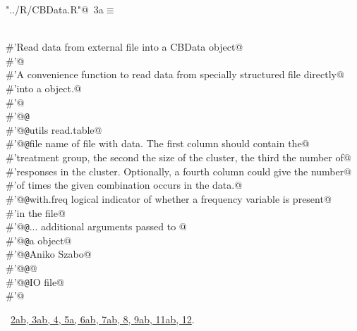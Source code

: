 \documentclass[reqno]{amsart}
\renewcommand{\NWtarget}[2]{\hypertarget{#1}{#2}}
\renewcommand{\NWlink}[2]{\hyperlink{#1}{#2}}
\begin{document}
\begin{flushleft} \small
\begin{minipage}{\linewidth}\label{scrap4}\raggedright\small
\NWtarget{nuweb3a}{} \verb@"../R/CBData.R"@\nobreak\ {\footnotesize {3a}}$\equiv$
\vspace{-1ex}
\begin{list}{}{} \item
\mbox{}\verb@@\\
\mbox{}\verb@#'Read data from external file into a CBData object@\\
\mbox{}\verb@#'@\\
\mbox{}\verb@#'A convenience function to read data from specially structured file directly@\\
\mbox{}\verb@#'into a  object.@\\
\mbox{}\verb@#'@\\
\mbox{}\verb@#'@{\tt @}\verb@export@\\
\mbox{}\verb@#'@{\tt @}\verb@importFrom utils read.table@\\
\mbox{}\verb@#'@{\tt @}\verb@param file name of file with data. The first column should contain the@\\
\mbox{}\verb@#'treatment group, the second the size of the cluster, the third the number of@\\
\mbox{}\verb@#'responses in the cluster. Optionally, a fourth column could give the number@\\
\mbox{}\verb@#'of times the given combination occurs in the data.@\\
\mbox{}\verb@#'@{\tt @}\verb@param with.freq logical indicator of whether a frequency variable is present@\\
\mbox{}\verb@#'in the file@\\
\mbox{}\verb@#'@{\tt @}\verb@param ... additional arguments passed to @\\
\mbox{}\verb@#'@{\tt @}\verb@return a  object@\\
\mbox{}\verb@#'@{\tt @}\verb@author Aniko Szabo@\\
\mbox{}\verb@#'@{\tt @}\verb@seealso {}@\\
\mbox{}\verb@#'@{\tt @}\verb@keywords IO file@\\
\mbox{}\verb@#'@\\
\mbox{}\verb@@{\NWsep}
\end{list}
\vspace{-1.5ex}
\footnotesize
\begin{list}{}{\setlength{\itemsep}{-\parsep}\setlength{\itemindent}{-\leftmargin}}
\item \NWtxtFileDefBy\ \NWlink{nuweb2a}{2a}\NWlink{nuweb2b}{b}\NWlink{nuweb3a}{, 3a}\NWlink{nuweb3b}{b}\NWlink{nuweb4}{, 4}\NWlink{nuweb5a}{, 5a}\NWlink{nuweb6a}{, 6a}\NWlink{nuweb6b}{b}\NWlink{nuweb7a}{, 7a}\NWlink{nuweb7b}{b}\NWlink{nuweb8}{, 8}\NWlink{nuweb9a}{, 9a}\NWlink{nuweb9b}{b}\NWlink{nuweb11a}{, 11a}\NWlink{nuweb11b}{b}\NWlink{nuweb12}{, 12}.

\item{}
\end{list}
\end{minipage}\vspace{4ex}
\end{flushleft}
\end{document}
